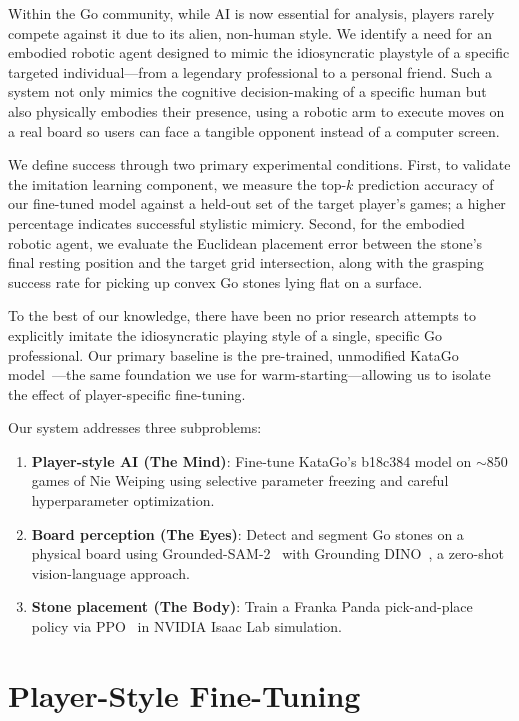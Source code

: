 \documentclass{article}
\begin{document}
Within the Go community, while AI is now essential for analysis, players rarely compete against it due to its alien, non-human style. We identify a need for an embodied robotic agent designed to mimic the idiosyncratic playstyle of a specific targeted individual---from a legendary professional to a personal friend. Such a system not only mimics the cognitive decision-making of a specific human but also physically embodies their presence, using a robotic arm to execute moves on a real board so users can face a tangible opponent instead of a computer screen.

We define success through two primary experimental conditions. First, to validate the imitation learning component, we measure the top-$k$ prediction accuracy of our fine-tuned model against a held-out set of the target player's games; a higher percentage indicates successful stylistic mimicry. Second, for the embodied robotic agent, we evaluate the Euclidean placement error between the stone's final resting position and the target grid intersection, along with the grasping success rate for picking up convex Go stones lying flat on a surface.

To the best of our knowledge, there have been no prior research attempts to explicitly imitate the idiosyncratic playing style of a single, specific Go professional. Our primary baseline is the pre-trained, unmodified KataGo model~\cite{wu2019accelerating}---the same foundation we use for warm-starting---allowing us to isolate the effect of player-specific fine-tuning.

Our system addresses three subproblems:
\begin{enumerate}
    \item \textbf{Player-style AI (The Mind)}: Fine-tune KataGo's b18c384 model on ${\sim}$850 games of Nie Weiping using selective parameter freezing and careful hyperparameter optimization.
    \item \textbf{Board perception (The Eyes)}: Detect and segment Go stones on a physical board using Grounded-SAM-2~\cite{ravi2024sam2} with Grounding DINO~\cite{liu2023grounding}, a zero-shot vision-language approach.
    \item \textbf{Stone placement (The Body)}: Train a Franka Panda pick-and-place policy via PPO~\cite{schulman2017proximal} in NVIDIA Isaac Lab simulation.
\end{enumerate}

\section{Player-Style Fine-Tuning}
\label{sec:finetuning}
\end{document}
